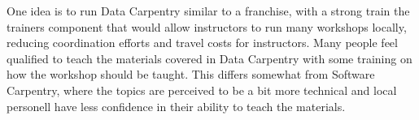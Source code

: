 \documentclass[11pt]{article}
\begin{document}
One idea is to run Data Carpentry similar to a franchise, with a strong train the 
trainers component that would allow instructors to run many workshops locally, 
reducing coordination efforts and travel costs for instructors. Many people feel 
qualified to teach the materials covered in Data Carpentry with some training on 
how the workshop should be taught. This differs somewhat from Software Carpentry, where
the topics are perceived to be a bit more technical and local personell have less 
confidence in their ability to teach the materials.
\end{document}
